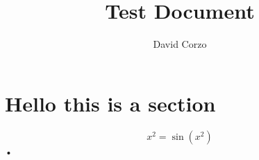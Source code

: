 \documentclass{article}
\title{Test Document}
\author{David Corzo}
\date{}
\begin{document}
\section{Hello this is a section}
\begin{equation}
x^2 = \sin(x^2)
\end{equation}•
\end{document}
